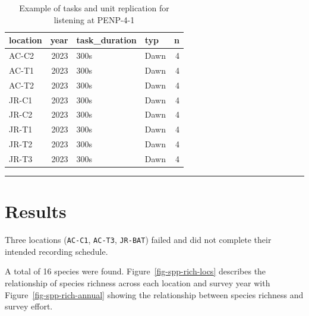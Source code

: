 \documentclass[
  letterpaper,
  DIV=11,
  numbers=noendperiod,
  oneside]{scrartcl}
\begin{document}
\hypertarget{tbl-loc-repl}{}
\begin{table}
\caption{\label{tbl-loc-repl}Example of tasks and unit replication for listening at PENP-4-1 }\tabularnewline

\centering
\begin{tabular}{l|r|l|l|r}
\hline
location & year & task\_duration & typ & n\\
\hline
AC-C2 & 2023 & 300s & Dawn & 4\\
\hline
AC-T1 & 2023 & 300s & Dawn & 4\\
\hline
AC-T2 & 2023 & 300s & Dawn & 4\\
\hline
JR-C1 & 2023 & 300s & Dawn & 4\\
\hline
JR-C2 & 2023 & 300s & Dawn & 4\\
\hline
JR-T1 & 2023 & 300s & Dawn & 4\\
\hline
JR-T2 & 2023 & 300s & Dawn & 4\\
\hline
JR-T3 & 2023 & 300s & Dawn & 4\\
\hline
\end{tabular}
\end{table}

\begin{center}\rule{0.5\linewidth}{0.5pt}\end{center}

\hypertarget{results}{%
\section{Results}\label{results}}

Three locations (\texttt{AC-C1}, \texttt{AC-T3}, \texttt{JR-BAT}) failed
and did not complete their intended recording schedule.

A total of 16 species were found. Figure~\ref{fig-spp-rich-locs}
describes the relationship of species richness across each location and
survey year with Figure~\ref{fig-spp-rich-annual} showing the
relationship between species richness and survey effort.
\end{document}

